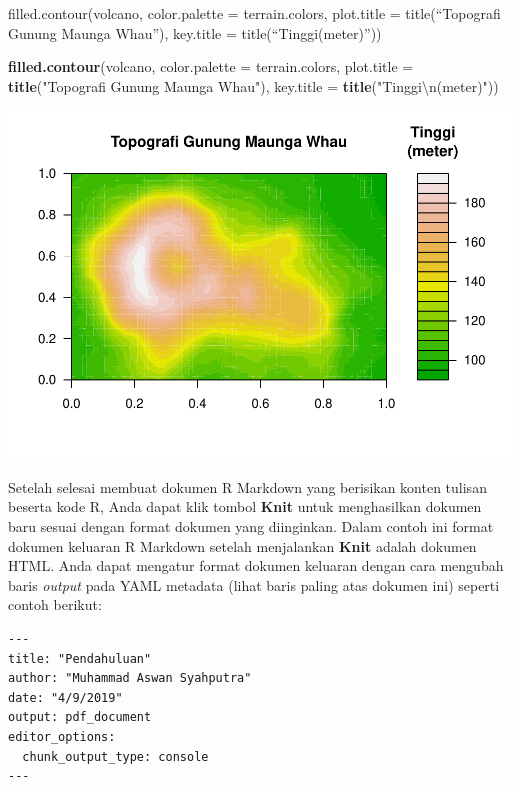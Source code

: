 \documentclass[]{article}
\newenvironment{Shaded}{\begin{snugshade}}{\end{snugshade}}
\newcommand{\CharTok}[1]{\textcolor[rgb]{0.31,0.60,0.02}{#1}}
\newcommand{\DataTypeTok}[1]{\textcolor[rgb]{0.13,0.29,0.53}{#1}}
\newcommand{\KeywordTok}[1]{\textcolor[rgb]{0.13,0.29,0.53}{\textbf{#1}}}
\newcommand{\NormalTok}[1]{#1}
\newcommand{\StringTok}[1]{\textcolor[rgb]{0.31,0.60,0.02}{#1}}
\begin{document}
filled.contour(volcano, color.palette = terrain.colors, plot.title =
title(``Topografi Gunung Maunga Whau''), key.title =
title(``Tinggi\n(meter)''))

\begin{Shaded}
\begin{Highlighting}[]
\KeywordTok{filled.contour}\NormalTok{(volcano,}
               \DataTypeTok{color.palette =}\NormalTok{ terrain.colors, }
               \DataTypeTok{plot.title =} \KeywordTok{title}\NormalTok{(}\StringTok{"Topografi Gunung Maunga Whau"}\NormalTok{), }
               \DataTypeTok{key.title =} \KeywordTok{title}\NormalTok{(}\StringTok{"Tinggi}\CharTok{\textbackslash{}n}\StringTok{(meter)"}\NormalTok{))}
\end{Highlighting}
\end{Shaded}

\includegraphics{001_pendahuluan_files/figure-latex/unnamed-chunk-2-1.pdf}

Setelah selesai membuat dokumen R Markdown yang berisikan konten tulisan
beserta kode R, Anda dapat klik tombol \textbf{Knit} untuk menghasilkan
dokumen baru sesuai dengan format dokumen yang diinginkan. Dalam contoh
ini format dokumen keluaran R Markdown setelah menjalankan \textbf{Knit}
adalah dokumen HTML. Anda dapat mengatur format dokumen keluaran dengan
cara mengubah baris \emph{output} pada YAML metadata (lihat baris paling
atas dokumen ini) seperti contoh berikut:

\begin{verbatim}
---
title: "Pendahuluan"
author: "Muhammad Aswan Syahputra"
date: "4/9/2019"
output: pdf_document
editor_options: 
  chunk_output_type: console
---
\end{verbatim}
\end{document}
